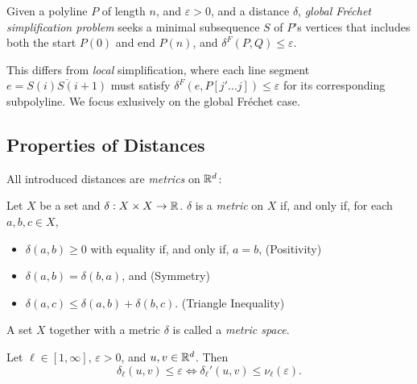 \begin{definition}
	Given a polyline \(P\) of length \(n\), and \(\varepsilon > 0\), and a distance \(\delta\), \emph{global Fréchet simplification problem} seeks a minimal subsequence \(S\) of \(P\)'s vertices that includes both the start \(P(0)\) and end \(P(n)\), and \(\delta^F(P, Q) \leq \varepsilon\).
\end{definition}

This differs from \emph{local} simplification, where each line segment \(e = \overline{S(i)S(i+1)}\) must satisfy \(\delta^F(e, P[j' \dots j]) \leq \varepsilon\) for its corresponding subpolyline. We focus exlusively on the global Fréchet case.

\subsection{Properties of Distances}
All introduced distances are \emph{metrics} on \(\mathbb{R}^d\)\cite{metric_spaces}:

\begin{definition}\label{def:metric}
  Let \(X\) be a set and \(\delta:X\times X \to \mathbb{R}\). \(\delta\) is a \emph{metric} on \(X\) if, and only if, for each \(a, b, c \in X\), 
  \begin{itemize}
    \item \(\delta(a, b) \geq 0\) with equality if, and only if, \(a = b\), \hfill (Positivity)
    \item \(\delta(a, b) = \delta(b, a)\), and \hfill (Symmetry)
    \item \(\delta(a, c) \leq \delta(a, b) + \delta(b, c)\). \hfill (Triangle Inequality)
  \end{itemize}

  A set \(X\) together with a metric \(\delta\) is called a \emph{metric space}.
\end{definition}

\begin{observation}\label{obs:unnormalize}
  Let \(\ell \in [1, \infty]\), \(\varepsilon > 0\), and \(u, v \in \mathbb{R}^d\). Then 
    \[\delta_\ell(u, v) \leq \varepsilon \iff \delta_\ell'(u, v) \leq \nu_\ell(\varepsilon).\]
\end{observation}

